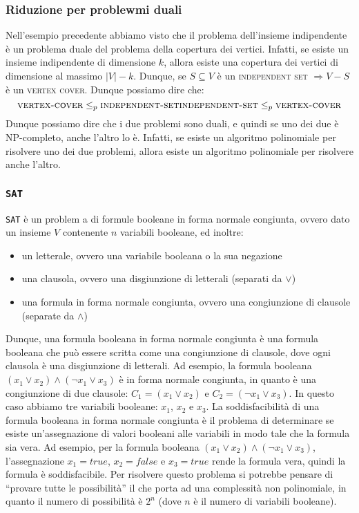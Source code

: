     \subsubsection{Riduzione per problewmi duali} 
        Nell'esempio precedente abbiamo visto che il problema dell'insieme indipendente è un problema duale del problema della copertura dei vertici. Infatti, se esiste un insieme indipendente di dimensione $k$, allora esiste una copertura dei vertici di dimensione al massimo $|V|-k$. Dunque, se $S\subseteq V$ è un \textsc{independent set} $\Rightarrow V-S$ è un \textsc{vertex cover}. Dunque possiamo dire che:
        $$
            \textsc{vertex-cover} \leq_p \textsc{independent-set}\\
            \textsc{independent-set} \leq_p \textsc{vertex-cover}
        $$
        Dunque possiamo dire che i due problemi sono duali, e quindi se uno dei due è NP-completo, anche l'altro lo è. Infatti, se esiste un algoritmo polinomiale per risolvere uno dei due problemi, allora esiste un algoritmo polinomiale per risolvere anche l'altro.
    \subsubsection{\texttt{SAT}}
        \texttt{SAT} è un problem a di formule booleane in forma normale congiunta, ovvero dato un insieme $V$ contenente $n$ variabili booleane, ed inoltre:
        \begin{itemize}
            \item un letterale, ovvero una variabile booleana o la sua negazione
            \item una clausola, ovvero una disgiunzione di letterali (separati da $\lor$)
            \item una formula in forma normale congiunta, ovvero una congiunzione di clausole (separate da $\land$)
        \end{itemize}
        Dunque, una formula booleana in forma normale congiunta è una formula booleana che può essere scritta come una congiunzione di clausole, dove ogni clausola è una disgiunzione di letterali. Ad esempio, la formula booleana $(x_1\lor x_2)\land(\neg x_1\lor x_3)$ è in forma normale congiunta, in quanto è una congiunzione di due clausole: $C_1=(x_1\lor x_2)$ e $C_2=(\neg x_1\lor x_3)$. In questo caso abbiamo tre variabili booleane: $x_1$, $x_2$ e $x_3$.\newline
        La soddisfacibilità di una formula booleana in forma normale congiunta è il problema di determinare se esiste un'assegnazione di valori booleani alle variabili in modo tale che la formula sia vera. Ad esempio, per la formula booleana $(x_1\lor x_2)\land(\neg x_1\lor x_3)$, l'assegnazione $x_1=true$, $x_2=false$ e $x_3=true$ rende la formula vera, quindi la formula è soddisfacibile.\newline
        Per risolvere questo problema si potrebbe pensare di ``provare tutte le possibilità'' il che porta ad una complessità non polinomiale, in quanto il numero di possibilità è $2^n$ (dove $n$ è il numero di variabili booleane). 
